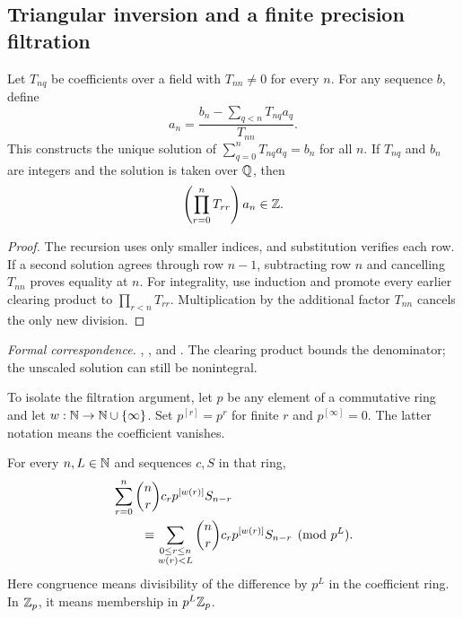 \subsection{Triangular inversion and a finite precision filtration}

\begin{theorem}
\label{thm:triangular-foundation}
Let $T_{nq}$ be coefficients over a field with $T_{nn}\ne0$ for every $n$.
For any sequence $b$, define
\[
a_n=\frac{b_n-\sum_{q<n}T_{nq}a_q}{T_{nn}}.
\]
This constructs the unique solution of
$\sum_{q=0}^{n}T_{nq}a_q=b_n$ for all $n$. If $T_{nq}$ and $b_n$ are integers
and the solution is taken over $\mathbb Q$, then
\[
\left(\prod_{r=0}^{n}T_{rr}\right)a_n\in\mathbb Z.
\]
\end{theorem}

\begin{proof}
The recursion uses only smaller indices, and substitution verifies each row.
If a second solution agrees through row $n-1$, subtracting row $n$ and
cancelling $T_{nn}$ proves equality at $n$. For integrality, use induction and
promote every earlier clearing product to $\prod_{r<n}T_{rr}$. Multiplication
by the additional factor $T_{nn}$ cancels the only new division.
\end{proof}

\begingroup\small\raggedright
\noindent\emph{Formal correspondence.}
, , and
. The clearing product bounds the
denominator; the unscaled solution can still be nonintegral.
\par\endgroup

To isolate the filtration argument, let $p$ be any element of a commutative
ring and let $w:\mathbb N\to\mathbb N\cup\{\infty\}$. Set $p^{[r]}=p^r$ for finite $r$
and $p^{[\infty]}=0$. The latter notation means the coefficient vanishes.

\begin{theorem}
\label{thm:filtered-foundation}
For every $n,L\in\mathbb N$ and sequences $c,S$ in that ring,
\[
\begin{split}
&\sum_{r=0}^{n}\binom nr c_rp^{[w(r)]}S_{n-r}\\
&\hspace{8mm}\equiv
\sum_{\substack{0\leq r\leq n\\w(r)<L}}
\binom nr c_rp^{[w(r)]}S_{n-r}\pmod{p^L}.
\end{split}
\]
Here congruence means divisibility of the difference by $p^L$ in the
coefficient ring. In $\mathbb Z_p$, it means membership in $p^L\mathbb Z_p$.
\end{theorem}

